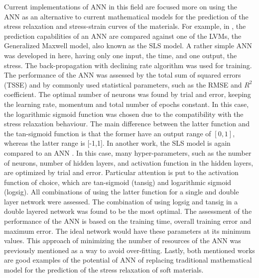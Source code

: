 Current implementations of ANN in this field are focused more on using the ANN as an alternative to current mathematical models for the prediction of the stress relaxation and stress-strain curves of the materials. For example, in \cite{saeidirad2013predictions}, the prediction capabilities of an ANN are compared against one of the LVMs, the Generalized Maxwell model, also known as the SLS model. A rather simple ANN was developed in here, having only one input, the time, and one output, the stress. The back-propagation with declining rate algorithm was used for training. The performance of the ANN was assessed by the total sum of squared errors (TSSE) and by commonly used statistical parameters, such as the RMSE and $R^2$ coefficient. The optimal number of neurons was found by trial and error, keeping the learning rate, momentum and total number of epochs constant. In this case, the logarithmic sigmoid function was chosen due to the compatibility with the stress relaxation behaviour. The main difference between the latter function and the tan-sigmoid function is that the former have an output range of $[0,1]$, whereas the latter range is [-1,1]. In another work, the SLS model is again compared to an ANN \cite{gao2015viscoelastic}. In this case, many hyper-parameters, such as the number of neurons, number of hidden layers, and activation function in the hidden layers, are optimized by trial and error. Particular attention is put to the activation function of choice, which are tan-sigmoid (tansig) and logarithmic sigmoid (logsig). All combinations of using the latter function for a single and double layer network were assessed. The combination of using logsig and tansig in a double layered network was found to be the most optimal. The assessment of the performance of the ANN is based on the training time, overall training error and maximum error. The ideal network would have these parameters at its minimum values. This approach of minimizing the number of resources of the ANN was previously mentioned as a way to avoid over-fitting. Lastly, both mentioned works are good examples of the potential of ANN of replacing traditional mathematical model for the prediction of the stress relaxation of soft materials.

